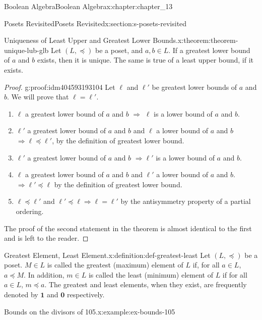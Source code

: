 \documentclass[twoside,10pt,]{book}
\numberwithin{equation}{section}
\begin{document}
\begin{chapterptx}{Boolean Algebra}{}{Boolean Algebra}{}{}{x:chapter:chapter_13}
\begin{sectionptx}{Posets Revisited}{}{Posets Revisited}{}{}{x:section:s-posets-revisited}
\begin{theorem}{Uniqueness of Least Upper and Greatest Lower Bounds.}{}{x:theorem:theorem-unique-lub-glb}%
Let \((L, \preceq)\) be a poset, and \(a, b \in  L\).   If a greatest lower bound of \(a\) and \(b\) exists, then it is unique.  The same is true of a least upper bound, if it exists.%
\end{theorem}
\begin{proof}{}{g:proof:idm404593193104}
Let \(\ell\) and \(\ell'\) be greatest lower bounds of \(a\) and \(b\).   We will prove that \(\ell=\ell'\).%
\begin{enumerate}[label=(\arabic*)]
\item{}\(\ell\) a  greatest lower bound of \(a\) and \(b\) \(\Rightarrow\)  \(\ell\) is a lower bound  of \(a\) and \(b\).%
\item{}\(\ell'\) a greatest lower bound of \(a\) and \(b\) and  \(\ell\)  a lower bound of \(a\) and \(b\) \(\Rightarrow 
\ell \preceq \ell'\), by the definition of greatest lower bound.%
\item{}\(\ell'\) a greatest lower bound of \(a\) and \(b\) \(\Rightarrow  \ell'\) is a lower bound of \(a\) and \(b\).%
\item{}\(\ell\) a greatest lower bound of \(a\) and \(b\) and \(\ell'\)  a lower bound of \(a\) and \(b\). \(\Rightarrow  \ell' \preceq \ell\) by the definition of greatest lower bound.%
\item{}\(\ell\preceq \ell'\) and \(\ell'\preceq \ell \Rightarrow  \ell=\ell'\)  by the antisymmetry property of a partial ordering.%
\end{enumerate}
%
\par
The proof of the second statement in the theorem is almost identical to the first and is left to the reader.%
\end{proof}
\begin{definition}{Greatest Element, Least Element.}{x:definition:def-greatest-least}%
%
%
\label{g:notation:idm404593174016}%
\label{g:notation:idm404593173376}%
Let \((L, \preceq)\) be a poset. \(M \in L\)  is called the greatest (maximum) element of \(L\) if, for all \(a \in  L\),  \(a \preceq  M\). In addition,  \(m \in  L\) is called the least (minimum) element of \(L\)  if for all  \(a \in  L\), \(m \preceq  a\).   The greatest and least elements, when they exist, are frequently denoted by \(\pmb{1}\) and \(\pmb{0}\) respectively.%
\end{definition}
\begin{example}{Bounds on the divisors of 105.}{x:example:ex-bounds-105}%

\end{example}
\end{sectionptx}
\end{chapterptx}
\end{document}
